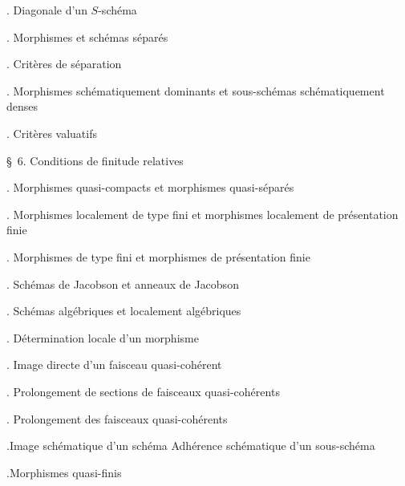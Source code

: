 \noindent{}. Diagonale d'un $S$-schéma\dotfill

\noindent{}. Morphismes et schémas séparés\dotfill

\noindent{}. Critères de séparation\dotfill

\noindent{}. Morphismes schématiquement dominants et sous-schémas schématiquement denses\dotfill

\noindent{}. Critères valuatifs\dotfill

\noindent\quad \S\ 6. Conditions de finitude relatives\dotfill

\noindent{}. Morphismes quasi-compacts et morphismes quasi-séparés\dotfill

\noindent{}. Morphismes localement de type fini et morphismes localement de présentation finie\dotfill

\noindent{}. Morphismes de type fini et morphismes de présentation finie\dotfill{}

\noindent{}. Schémas de Jacobson et anneaux de Jacobson\dotfill

\noindent{}. Schémas algébriques et localement algébriques\dotfill

\noindent{}. Détermination locale d'un morphisme\dotfill

\noindent{}. Image directe d'un faisceau quasi-cohérent\dotfill

\noindent{}. Prolongement de sections de faisceaux quasi-cohérents

\noindent{}. Prolongement des faisceaux quasi-cohérents\dotfill

\noindent{}.Image schématique d'un schéma Adhérence schématique d'un sous-schéma\dotfill

\noindent{}.Morphismes quasi-finis\dotfill

